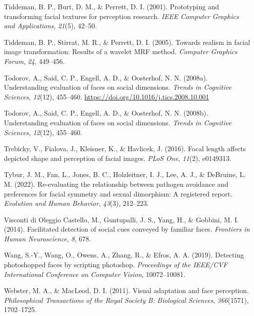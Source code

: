 \documentclass[
  man,floatsintext]{apa6}
\newlength{\cslhangindent}
\newlength{\cslentryspacingunit} %
\newenvironment{CSLReferences}[2] %
 {%
  \setlength{\parindent}{0pt}
  \ifodd #1
  \let\oldpar\par
  \def\par{\hangindent=\cslhangindent\oldpar}
  \fi
  \setlength{\parskip}{#2\cslentryspacingunit}
 }%
 {}
\begin{document}
\begin{CSLReferences}{1}{0}
\leavevmode{}%
Tiddeman, B. P., Burt, D. M., \& Perrett, D. I. (2001). Prototyping and transforming facial textures for perception research. \emph{IEEE Computer Graphics and Applications}, \emph{21}(5), 42--50.

\leavevmode{}%
Tiddeman, B. P., Stirrat, M. R., \& Perrett, D. I. (2005). Towards realism in facial image transformation: Results of a wavelet MRF method. \emph{Computer Graphics Forum}, \emph{24}, 449--456.

\leavevmode{}%
Todorov, A., Said, C. P., Engell, A. D., \& Oosterhof, N. N. (2008a). Understanding evaluation of faces on social dimensions. \emph{Trends in Cognitive Sciences}, \emph{12}(12), 455--460. \url{https://doi.org/10.1016/j.tics.2008.10.001}

\leavevmode{}%
Todorov, A., Said, C. P., Engell, A. D., \& Oosterhof, N. N. (2008b). Understanding evaluation of faces on social dimensions. \emph{Trends in Cognitive Sciences}, \emph{12}(12), 455--460.

\leavevmode{}%
Trebicky, V., Fialova, J., Kleisner, K., \& Havlicek, J. (2016). Focal length affects depicted shape and perception of facial images. \emph{PLoS One}, \emph{11}(2), e0149313.

\leavevmode{}%
Tybur, J. M., Fan, L., Jones, B. C., Holzleitner, I. J., Lee, A. J., \& DeBruine, L. M. (2022). Re-evaluating the relationship between pathogen avoidance and preferences for facial symmetry and sexual dimorphism: A registered report. \emph{Evolution and Human Behavior}, \emph{43}(3), 212--223.

\leavevmode{}%
Visconti di Oleggio Castello, M., Guntupalli, J. S., Yang, H., \& Gobbini, M. I. (2014). Facilitated detection of social cues conveyed by familiar faces. \emph{Frontiers in Human Neuroscience}, \emph{8}, 678.

\leavevmode{}%
Wang, S.-Y., Wang, O., Owens, A., Zhang, R., \& Efros, A. A. (2019). Detecting photoshopped faces by scripting photoshop. \emph{Proceedings of the IEEE/CVF International Conference on Computer Vision}, 10072--10081.

\leavevmode{}%
Webster, M. A., \& MacLeod, D. I. (2011). Visual adaptation and face perception. \emph{Philosophical Transactions of the Royal Society B: Biological Sciences}, \emph{366}(1571), 1702--1725.


\end{CSLReferences}
\end{document}
